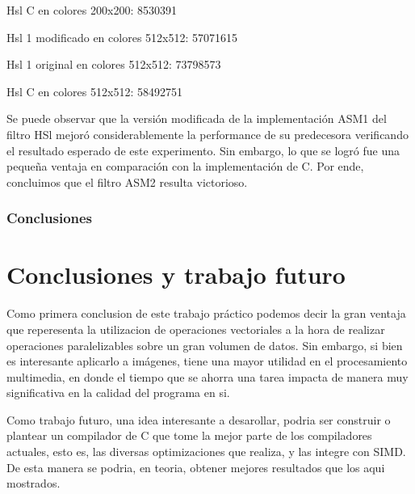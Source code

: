 \documentclass[a4paper]{article}
\begin{document}
Hsl C en colores 200x200: 8530391

Hsl 1 modificado en colores 512x512: 57071615

Hsl 1 original en colores 512x512: 73798573

Hsl C en colores 512x512: 58492751

Se puede observar que la versión modificada de la implementación ASM1 del filtro HSl mejoró considerablemente la performance de su predecesora verificando el resultado esperado de este experimento. Sin embargo, lo que se logró fue una pequeña ventaja en comparación con la implementación de C. Por ende, concluimos que el filtro ASM2 resulta victorioso.

\subsubsection{Conclusiones}


\newpage
\section{Conclusiones y trabajo futuro}
Como primera conclusion de este trabajo práctico podemos decir la gran ventaja que reperesenta la utilizacion de operaciones vectoriales a la hora de realizar operaciones paralelizables sobre un gran volumen de datos. Sin embargo, si bien es interesante aplicarlo a imágenes, tiene una mayor utilidad en el procesamiento multimedia, en donde el tiempo que se ahorra una tarea impacta de manera muy significativa en la calidad del programa en si.

Como trabajo futuro, una idea interesante a desarollar, podria ser construir o plantear un compilador de C que tome la mejor parte de los compiladores actuales, esto es, las diversas optimizaciones que
realiza, y las integre con SIMD. De esta manera se podria, en teoria, obtener mejores resultados que los aqui mostrados.
\end{document}

